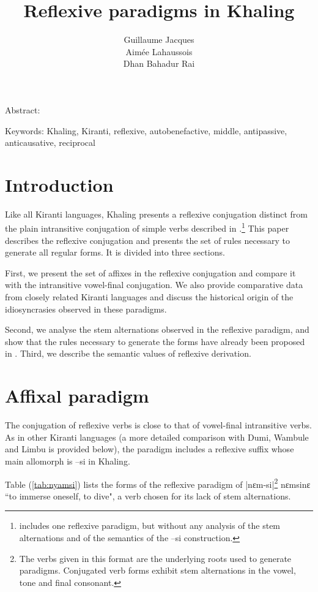 \documentclass[twoside,a4paper,11pt]{article}
\newcommand{\ipa}[1]{{\phon#1}}
\begin{document}
\title{Reflexive paradigms in Khaling } 

\author{Guillaume Jacques\\Aimée Lahaussois\\Dhan Bahadur Rai}

\maketitle

\linenumbers
Abstract: 


Keywords: Khaling, Kiranti, reflexive,  autobenefactive, middle, antipassive, anticausative, reciprocal


 \section{Introduction}
Like all Kiranti languages, Khaling presents a reflexive conjugation distinct from the plain intransitive conjugation of simple verbs described in \citet{jacques12khaling}.\footnote{\citet{toba84khaling} includes one reflexive paradigm, but without any analysis of the stem alternations and of the semantics of the \ipa{--si} construction.}  This paper describes the reflexive conjugation and presents the set of rules necessary to generate all regular forms. It is divided into three sections. 

First, we present the set of affixes in the reflexive conjugation and compare it with the intransitive    vowel-final  conjugation. We also   provide comparative data from  closely related Kiranti languages and discuss the historical origin of the idiosyncrasies observed in these paradigms.

Second, we analyse the stem alternations observed in the reflexive paradigm, and show that the rules necessary to generate the forms have already been proposed in  \citet{jacques12khaling}. Third, we describe the semantic values of   reflexive derivation.

\section{Affixal paradigm}
The conjugation of reflexive verbs is close to that of vowel-final intransitive verbs. As in other Kiranti languages (a more detailed comparison with Dumi, Wambule and Limbu is provided below), the paradigm includes a reflexive suffix  whose main allomorph is \ipa{--si} in Khaling. 

Table (\ref{tab:nyamsi}) lists the forms of the reflexive paradigm of   |\ipa{nɛm-si}|\footnote{The verbs  given in this format are the underlying roots used to generate paradigms. Conjugated verb forms exhibit stem alternations in the vowel, tone and final consonant.}
 \ipa{nɛmsinɛ}  ``to immerse oneself, to dive", a verb chosen for its lack of stem alternations.
\end{document}

